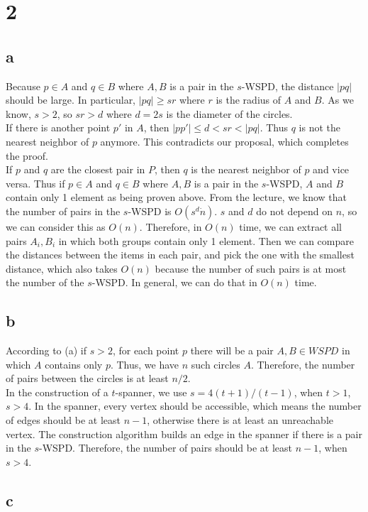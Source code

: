 \section*{2}
\subsection*{a}

Because $p \in A$ and $q \in B$ where ${A,B}$ is a pair in the $s$-WSPD, the distance $|pq|$ should be large. In particular, $|pq| \geq sr$ where $r$ is the radius of $A$ and $B$. As we know, $s > 2$, so $sr > d$ where $d = 2s$ is the diameter of the circles. \\

If there is another point $p'$ in $A$, then $|pp'| \leq d < sr < |pq|$. Thus $q$ is not the nearest neighbor of $p$ anymore. This contradicts our proposal, which completes the proof.\\

If $p$ and $q$ are the closest pair in $P$, then $q$ is the nearest neighbor of $p$ and vice versa. Thus if $p \in A$ and $q \in B$ where ${A,B}$ is a pair in the $s$-WSPD, $A$ and $B$ contain only 1 element as being proven above. From the lecture, we know that the number of pairs in the $s$-WSPD is $O(s^d \dot n)$. $s$ and $d$ do not depend on $n$, so we can consider this as $O(n)$. Therefore, in $O(n)$ time, we can extract all pairs ${A_i, B_i}$ in which both groups contain only 1 element. Then we can compare the distances between the items in each pair, and pick the one with the smallest distance, which also takes $O(n)$ because the number of such pairs is at most the number of the $s$-WSPD. In general, we can do that in $O(n)$ time.\\

\subsection*{b}
According to (a) if $s > 2$, for each point $p$ there will be a pair ${A,B} \in WSPD$ in which $A$ contains only $p$.
Thus, we have $n$ such circles $A$. Therefore, the number of pairs between the circles is at least $n/2$. \\

In the construction of a $t$-spanner, we use $s = 4(t + 1) / (t - 1)$, when $t > 1$, $s > 4$. In the spanner, every vertex should be accessible, which means the number of edges should be at least $n - 1$, otherwise there is at least an unreachable vertex. The construction algorithm builds an edge in the spanner if there is a pair in the $s$-WSPD. Therefore, the number of pairs should be at least $n - 1$, when $s > 4$. \\

\subsection*{c}
